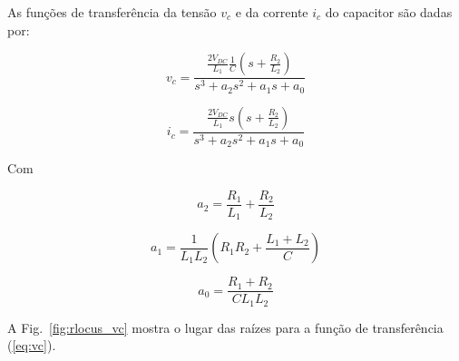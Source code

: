     As funções de transferência da tensão $v_c$ e da corrente $i_c$ do
    capacitor são dadas por:

    \begin{equation}
        v_c = \frac{\frac{2V_{DC}}{L_1} \frac{1}{C} \left( s + \frac{R_2}{L_2} \right)}{s^3 + a_2 s^2 + a_1 s + a_0}
        \label{eq:vc}
    \end{equation}

    \begin{equation}
        i_c = \frac{\frac{2V_{DC}}{L_1} s \left( s + \frac{R_2}{L_2} \right)}{s^3 + a_2 s^2 + a_1 s + a_0}
        \label{eq:ic}
    \end{equation}

    Com

    \begin{equation*}
        a_2 = \frac{R_1}{L_1} + \frac{R_2}{L_2}
    \end{equation*}

    \begin{equation*}
        a_1 = \frac{1}{L_1 L_2} \left( R_1 R_2 + \frac{L_1 + L_2}{C} \right)
    \end{equation*}

    \begin{equation*}
        a_0 = \frac{R_1 + R_2}{C L_1 L_2}
    \end{equation*}


    A Fig.~\ref{fig:rlocus_vc} mostra o lugar das raízes para a função de
    transferência (\ref{eq:vc}).

